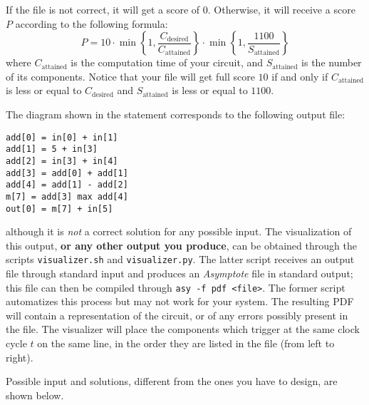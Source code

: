 If the file is not correct, it will get a score of $0$. Otherwise, it will receive a score $P$ according to the following formula:
\[
	P = 10 \cdot \min \left\{1, \frac{C_\text{desired}}{C_\text{attained}}\right\} \cdot \min \left\{1, \frac{1100}{S_\text{attained}}\right\}
\]
where $C_\text{attained}$ is the computation time of your circuit, and $S_\text{attained}$ is the number of its components. Notice that your file will get full score $10$ if and only if $C_\text{attained}$ is less or equal to $C_\text{desired}$ and $S_\text{attained}$ is less or equal to $1100$.



\Examples

The diagram shown in the statement corresponds to the following output file:
\begin{lstlisting}
add[0] = in[0] + in[1]
add[1] = 5 + in[3]
add[2] = in[3] + in[4]
add[3] = add[0] + add[1]
add[4] = add[1] - add[2]
m[7] = add[3] max add[4]
out[0] = m[7] + in[5]
\end{lstlisting}
although it is \emph{not} a correct solution for any possible input. The visualization of this output, \textbf{or any other output you produce}, can be obtained through the scripts \verb|visualizer.sh| and \verb|visualizer.py|. The latter script receives an output file through standard input and produces an \emph{Asymptote} file in standard output; this file can then be compiled through \verb|asy -f pdf <file>|. The former script automatizes this process but may not work for your system. The resulting PDF will contain a representation of the circuit, or of any errors possibly present in the file. The visualizer will place the components which trigger at the same clock cycle $t$ on the same line, in the order they are listed in the file (from left to right).

Possible input and solutions, different from the ones you have to design, are shown below.
\begin{example}
%
%
%
\end{example}



